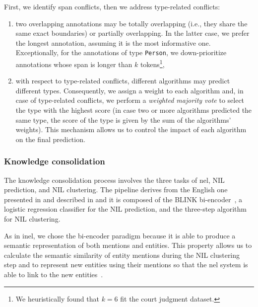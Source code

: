First, we identify span conflicts, then we address type-related conflicts:
\begin{enumerate}
    \item two overlapping annotations may be totally overlapping (i.e., they share the same exact boundaries) or partially overlapping. In the latter case, we prefer the longest annotation, assuming it is the most informative one. Exceptionally, for the annotations of type \texttt{Person}, we down-prioritize annotations whose span is longer than $k$ tokens\footnote{We heuristically found that $k=6$ fit the court judgment dataset.},
    \item with respect to type-related conflicts, different algorithms may predict different types. Consequently, we assign a weight to each algorithm and, in case of type-related conflicts, we perform a \textit{weighted majority vote} to select the type with the highest score (in case two or more algorithms predicted the same type, the score of the type is given by the sum of the algorithms' weights).
    This mechanism allows us to control the impact of each algorithm on the final prediction.
    

\end{enumerate}



\subsubsection{Knowledge consolidation}
The knowledge consolidation process involves the three tasks of \ac{nel}, NIL prediction, and NIL clustering. The pipeline derives from the English one presented in \textcite{ijckg2022} and described in  and it is composed of the BLINK bi-encoder~\cite{blink}, a logistic regression classifier for the NIL prediction, and the three-step algorithm for NIL clustering.

As in \acl{inel}, we chose the bi-encoder paradigm because it is able to produce a semantic representation of both mentions and entities. This property allows us to calculate the semantic similarity of entity mentions during the NIL clustering step and to represent new entities using their mentions so that the \ac{nel} system is able to link to the new entities~\cite{ijckg2022}.

